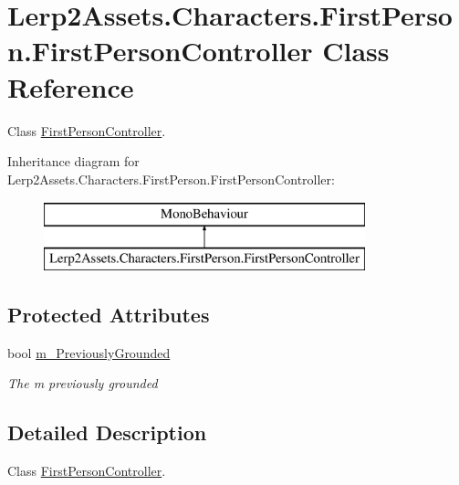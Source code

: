 \hypertarget{class_lerp2_assets_1_1_characters_1_1_first_person_1_1_first_person_controller}{}\section{Lerp2\+Assets.\+Characters.\+First\+Person.\+First\+Person\+Controller Class Reference}
\label{class_lerp2_assets_1_1_characters_1_1_first_person_1_1_first_person_controller}


Class \hyperlink{class_lerp2_assets_1_1_characters_1_1_first_person_1_1_first_person_controller}{First\+Person\+Controller}.  


Inheritance diagram for Lerp2\+Assets.\+Characters.\+First\+Person.\+First\+Person\+Controller\+:\begin{figure}[H]
\begin{center}
\leavevmode
\includegraphics[height=2.000000cm]{class_lerp2_assets_1_1_characters_1_1_first_person_1_1_first_person_controller}
\end{center}
\end{figure}
\subsection*{Protected Attributes}
\begin{DoxyCompactItemize}
\item 
bool \hyperlink{class_lerp2_assets_1_1_characters_1_1_first_person_1_1_first_person_controller_ad54620db5dd489534702e61e4e648ca6}{m\+\_\+\+Previously\+Grounded}
\begin{DoxyCompactList}\small\item\em The m previously grounded \end{DoxyCompactList}\end{DoxyCompactItemize}


\subsection{Detailed Description}
Class \hyperlink{class_lerp2_assets_1_1_characters_1_1_first_person_1_1_first_person_controller}{First\+Person\+Controller}. 

